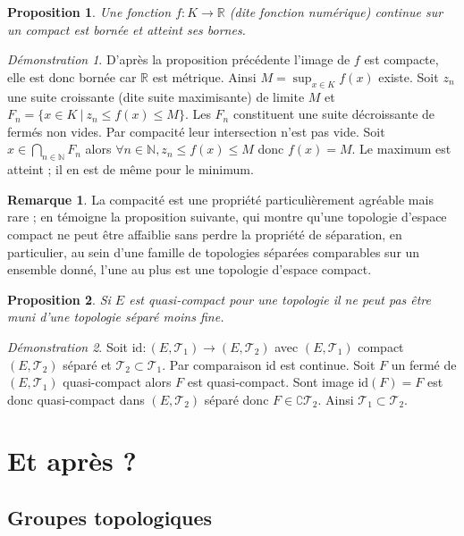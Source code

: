 \documentclass[a4paper, 11pt, french]{book}
\theoremstyle{plain} %
\newtheorem{proposition}{Proposition}
\theoremstyle{definition} %
\newtheorem{remarque}{Remarque}
\theoremstyle{remark} %
\newtheorem*{demonstration}{Démonstration}
\newcommand{\1}{\mathds{1}}
\newcommand{\id}{\mathrm{id}}
\newcommand{\N}{\mathbb{N}}
\newcommand{\R}{\mathbb{R}}
\newcommand{\scr}[1]{\mathscr{#1}}
\newcommand\ens[2]{\{#1 \ |\ #2\}}
\begin{document}
\begin{proposition}
	Une fonction $f:K\rightarrow\R$ (dite fonction numérique) continue sur un compact est bornée et atteint ses bornes.
\end{proposition}

\begin{demonstration}
	D’après la proposition précédente l’image de $f$ est compacte, elle est donc bornée car $\R$ est métrique.
	Ainsi $M=\sup_{x\in K}f(x)$ existe.
	Soit $z_n$ une suite croissante (dite suite maximisante) de limite $M$ et $F_n=\ens{x\in K}{z_n\leqslant f(x)\leqslant M}$.
	Les $F_n$ constituent une suite décroissante de fermés non vides.
	Par compacité leur intersection n’est pas vide.
	Soit $x\in\bigcap_{n\in\N}F_n$ alors $\forall n\in\N, z_n\leqslant f(x)\leqslant M$ donc $f(x)=M$.
	Le maximum est atteint ; il en est de même pour le minimum.
\end{demonstration}

\begin{remarque}
	La compacité est une propriété particulièrement agréable mais rare ; en témoigne la proposition suivante, qui montre qu’une topologie d’espace compact ne peut être affaiblie sans perdre la propriété de séparation, en particulier, au sein d’une famille de topologies séparées comparables sur un ensemble donné, l’une au plus est une topologie d’espace compact.
\end{remarque}

\begin{proposition}
	Si $E$ est quasi-compact pour une topologie il ne peut pas être muni d’une topologie séparé moins fine.
\end{proposition}

\begin{demonstration}
	Soit $\id:(E, \scr{T}_1)\rightarrow(E, \scr{T}_2)$ avec $(E, \scr{T}_1)$ compact $(E, \scr{T}_2)$ séparé et $\scr{T}_2\subset\scr{T}_1$.
	Par comparaison $\id$ est continue.
	Soit $F$ un fermé de $(E, \scr{T}_1)$ quasi-compact alors $F$ est quasi-compact.
	Sont image $\id(F)=F$ est donc quasi-compact dans $(E, \scr{T}_2)$ séparé donc $F\in\complement\scr{T}_2$.
	Ainsi $\scr{T}_1\subset\scr{T}_2$.
\end{demonstration}

\part{Et après ?}

\chapter{Groupes topologiques}
\end{document}
